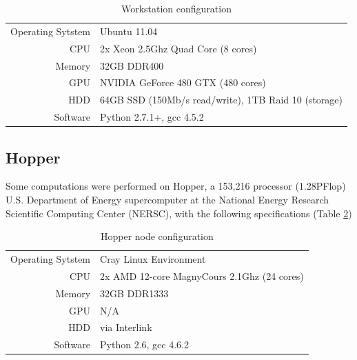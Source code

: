 \documentclass[phd,tocprelim]{cornell}
\begin{document}
\begin{table}[htp]
    \caption{Workstation configuration}
    \label{worktab}
    \begin{center}
\begin{tabular}{r|l}
    Operating Sytstem & Ubuntu 11.04 \\
    CPU & 2x Xeon 2.5Ghz Quad Core (8 cores) \\
    Memory & 32GB DDR400 \\
    GPU & NVIDIA GeForce 480 GTX (480 cores) \\
    HDD & 64GB SSD (150Mb/s read/write), 1TB Raid 10 (storage) \\
    Software & Python 2.7.1+, gcc 4.5.2
\end{tabular}
\end{center}
\end{table}

\subsection{Hopper}

Some computations were performed on Hopper, a 153,216 processor (1.28PFlop) U.S. Department of Energy supercomputer at the National Energy Research Scientific Computing Center (NERSC), with the following specifications (Table \ref{hoppertab})

\begin{table}[htp]
    \caption{Hopper node configuration}
    \label{hoppertab}
    \begin{center}
\begin{tabular}{r|l}
    Operating Sytstem & Cray Linux Environment \\
    CPU & 2x AMD 12-core MagnyCours 2.1Ghz (24 cores) \\
    Memory & 32GB DDR1333 \\
    GPU & N/A \\
    HDD & via Interlink \\
    Software & Python 2.6, gcc 4.6.2
\end{tabular}
\end{center}
\end{table}


%
\end{document}
